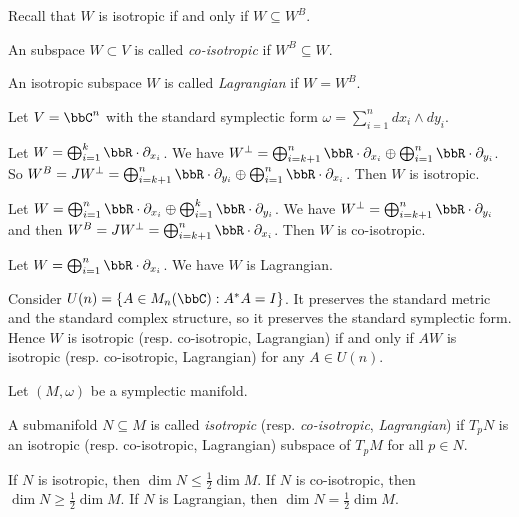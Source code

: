   Recall that $W$ is isotropic if and only if $W \subseteq W^B$.
  \begin{definition}
    An subspace $W \subset V$ is called \emph{co-isotropic} if $W^B \subseteq W$.
  \end{definition}
  \begin{definition}
    An isotropic subspace $W$ is called \emph{Lagrangian} if $W = W^B$.
  \end{definition}

  \begin{example}
    Let $V = \bbC^n$ with the standard symplectic form $\omega = \sum_{i=1}^n dx_i \wedge dy_i$.

    Let $W = \bigoplus_{i=1}^k \bbR \cdot \partial_{x_i}$.
    We have $W^\perp = \bigoplus_{i=k+1}^n \bbR \cdot \partial_{x_i} \oplus \bigoplus_{i=1}^n \bbR \cdot \partial_{y_i}$.
    So $W^B = J W^\perp = \bigoplus_{i=k+1}^n \bbR \cdot \partial_{y_i} \oplus \bigoplus_{i=1}^n \bbR \cdot \partial_{x_i}$.
    Then $W$ is isotropic.

    Let $W = \bigoplus_{i=1}^n \bbR \cdot \partial_{x_i} \oplus \bigoplus_{i=1}^k \bbR \cdot \partial_{y_i}$.
    We have $W^\perp = \bigoplus_{i=k+1}^n \bbR \cdot \partial_{y_i}$ and then $W^B = J W^\perp = \bigoplus_{i=k+1}^n \bbR \cdot \partial_{x_i}$.
    Then $W$ is co-isotropic.

    Let $W = \bigoplus_{i=1}^n \bbR \cdot \partial_{x_i}$.
    We have $W$ is Lagrangian.

    Consider $U(n) = \{A \in M_n(\bbC): A^* A = I\}$.
    It preserves the standard metric and the standard complex structure, so it preserves the standard symplectic form.
    Hence $W$ is isotropic (resp. co-isotropic, Lagrangian) if and only if $A W$ is isotropic (resp. co-isotropic, Lagrangian) for any $A \in U(n)$.
  \end{example}

  Let $(M, \omega)$ be a symplectic manifold.

  \begin{definition}
    A submanifold $N \subseteq M$ is called \emph{isotropic} (resp. \emph{co-isotropic}, \emph{Lagrangian}) if $T_p N$ is an isotropic (resp. co-isotropic, Lagrangian) subspace of $T_p M$ for all $p \in N$.
  \end{definition}

  If $N$ is isotropic, then $\dim N \leq \frac{1}{2} \dim M$.
  If $N$ is co-isotropic, then $\dim N \geq \frac{1}{2} \dim M$.
  If $N$ is Lagrangian, then $\dim N = \frac{1}{2} \dim M$.

